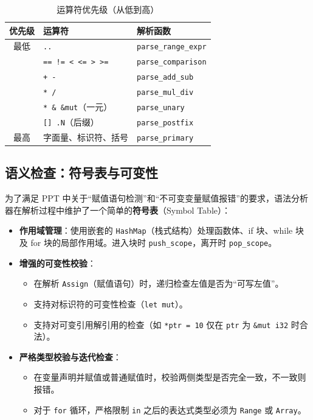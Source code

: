 \documentclass[12pt,a4paper]{ctexart}
\begin{document}
\begin{table}[H]
\centering
\caption{运算符优先级（从低到高）}
\begin{tabular}{cll}
\toprule
\textbf{优先级} & \textbf{运算符} & \textbf{解析函数} \\
\midrule
最低 & \texttt{..} & \texttt{parse\_range\_expr} \\
     & \texttt{== != < <= > >=} & \texttt{parse\_comparison} \\
     & \texttt{+ -} & \texttt{parse\_add\_sub} \\
     & \texttt{* /} & \texttt{parse\_mul\_div} \\
     & \texttt{* \& \&mut}（一元） & \texttt{parse\_unary} \\
     & \texttt{[] .N}（后缀） & \texttt{parse\_postfix} \\
最高 & 字面量、标识符、括号 & \texttt{parse\_primary} \\
\bottomrule
\end{tabular}
\end{table}

\subsection{语义检查：符号表与可变性}

为了满足 PPT 中关于“赋值语句检测”和“不可变变量赋值报错”的要求，语法分析器在解析过程中维护了一个简单的\textbf{符号表}（Symbol Table）：

\begin{itemize}
    \item \textbf{作用域管理}：使用嵌套的 \texttt{HashMap}（栈式结构）处理函数体、if 块、while 块及 for 块的局部作用域。进入块时 \texttt{push\_scope}，离开时 \texttt{pop\_scope}。
    \item \textbf{增强的可变性校验}：
    \begin{itemize}
        \item 在解析 \texttt{Assign}（赋值语句）时，递归检查左值是否为“可写左值”。
        \item 支持对标识符的可变性检查（\texttt{let mut}）。
        \item 支持对可变引用解引用的检查（如 \texttt{*ptr = 10} 仅在 \texttt{ptr} 为 \texttt{\&mut i32} 时合法）。
    \end{itemize}
    \item \textbf{严格类型校验与迭代检查}：
    \begin{itemize}
        \item 在变量声明并赋值或普通赋值时，校验两侧类型是否完全一致，不一致则报错。
        \item 对于 \texttt{for} 循环，严格限制 \texttt{in} 之后的表达式类型必须为 \texttt{Range} 或 \texttt{Array}。
    \end{itemize}
\end{itemize}
\end{document}

